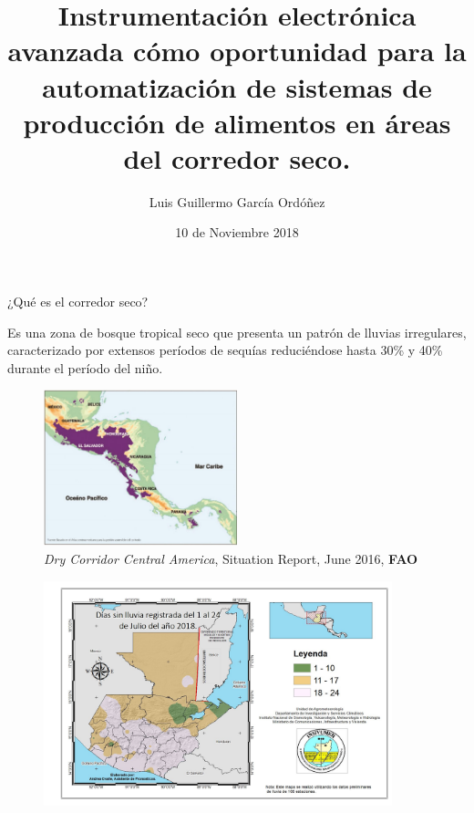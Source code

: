\documentclass[]{beamer}
\title{Instrumentación electrónica avanzada cómo oportunidad para la automatización de sistemas de producción de alimentos en áreas del corredor seco.}
\author{Luis Guillermo García Ordóñez}
\date{10 de Noviembre 2018}
\begin{document}
\maketitle

\begin{frame}{¿Qué es el corredor seco?}

Es una zona de bosque tropical seco que presenta un patrón de lluvias irregulares, caracterizado por extensos períodos de sequías reduciéndose hasta 30\% y 40\% durante el período del niño.
\begin{figure}
    \centering
    \includegraphics[width=0.5\textwidth]{Docs/Mapa_CS}
    \caption{\small \textit{Dry Corridor Central America}, Situation Report, June 2016, \textbf{FAO}}
    \label{fig:my_label}
\end{figure}
\end{frame}

\begin{frame}{}
\begin{figure}
    \centering
    \includegraphics[width=0.9\textwidth]{Docs/diassinlluvia}
    \label{fig:my_label}
\end{figure}
\end{frame}
\end{document}
